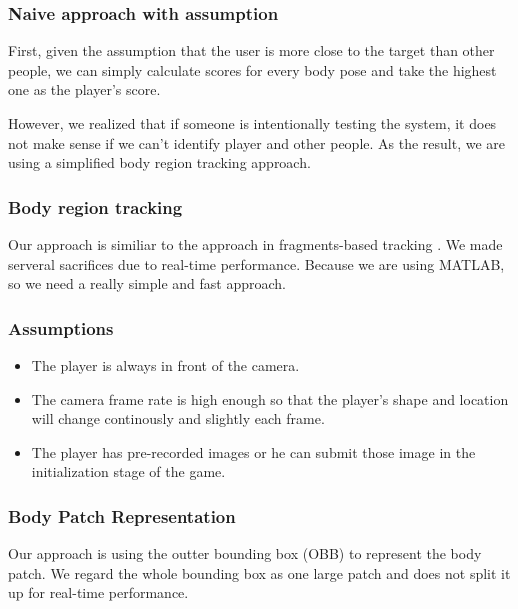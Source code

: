 \documentclass[11pt,twocolumn,letterpaper]{article}
\begin{document}
\subsubsection {Naive approach with assumption}
\par
First, given the assumption that the user is more close to the target than other people, we can simply calculate scores for every body pose and take the highest one as the player's score.
\par
However, we realized that if someone is intentionally testing the system, it does not make sense if we can't identify player and other people. As the result, we are using a simplified body region tracking approach.
\subsubsection{Body region tracking}
\par
Our approach is similiar to the approach in fragments-based tracking  \cite{1640835}. We made serveral sacrifices due to real-time performance. Because  we are using MATLAB, so we need a really simple and fast approach. 
\par
\subsubsection*{Assumptions}
\begin{itemize}
\item The player is always in front of the camera.
\item The camera frame rate is high enough so that the player's shape and location will change continously and slightly each frame.
\item The player has pre-recorded images or he can submit those image in the initialization stage of the game.
\end{itemize}
\subsubsection*{Body Patch Representation}
\par
Our approach is using the outter bounding box (OBB) to represent the body patch. We regard the whole bounding box as one large patch and does not split it up for real-time performance.
\end{document}
